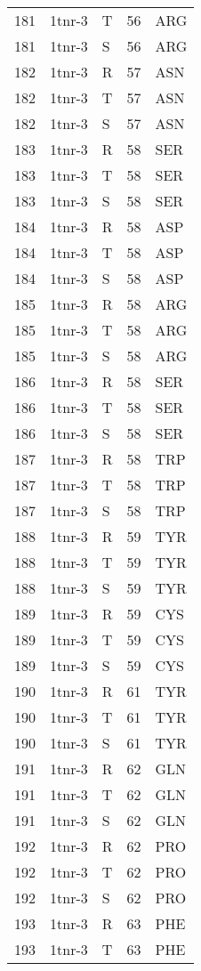 \begin{tiny}
\begin{longtable}[l]{l|l|l|l|l}
	181 & 1tnr-3 & T & 56 & ARG \\
	181 & 1tnr-3 & S & 56 & ARG \\
	182 & 1tnr-3 & R & 57 & ASN \\
	182 & 1tnr-3 & T & 57 & ASN \\
	182 & 1tnr-3 & S & 57 & ASN \\
	183 & 1tnr-3 & R & 58 & SER \\
	183 & 1tnr-3 & T & 58 & SER \\
	183 & 1tnr-3 & S & 58 & SER \\
	184 & 1tnr-3 & R & 58 & ASP \\
	184 & 1tnr-3 & T & 58 & ASP \\
	184 & 1tnr-3 & S & 58 & ASP \\
	185 & 1tnr-3 & R & 58 & ARG \\
	185 & 1tnr-3 & T & 58 & ARG \\
	185 & 1tnr-3 & S & 58 & ARG \\
	186 & 1tnr-3 & R & 58 & SER \\
	186 & 1tnr-3 & T & 58 & SER \\
	186 & 1tnr-3 & S & 58 & SER \\
	187 & 1tnr-3 & R & 58 & TRP \\
	187 & 1tnr-3 & T & 58 & TRP \\
	187 & 1tnr-3 & S & 58 & TRP \\
	188 & 1tnr-3 & R & 59 & TYR \\
	188 & 1tnr-3 & T & 59 & TYR \\
	188 & 1tnr-3 & S & 59 & TYR \\
	189 & 1tnr-3 & R & 59 & CYS \\
	189 & 1tnr-3 & T & 59 & CYS \\
	189 & 1tnr-3 & S & 59 & CYS \\
	190 & 1tnr-3 & R & 61 & TYR \\
	190 & 1tnr-3 & T & 61 & TYR \\
	190 & 1tnr-3 & S & 61 & TYR \\
	191 & 1tnr-3 & R & 62 & GLN \\
	191 & 1tnr-3 & T & 62 & GLN \\
	191 & 1tnr-3 & S & 62 & GLN \\
	192 & 1tnr-3 & R & 62 & PRO \\
	192 & 1tnr-3 & T & 62 & PRO \\
	192 & 1tnr-3 & S & 62 & PRO \\
	193 & 1tnr-3 & R & 63 & PHE \\
	193 & 1tnr-3 & T & 63 & PHE \\

\end{longtable}
\end{tiny}
